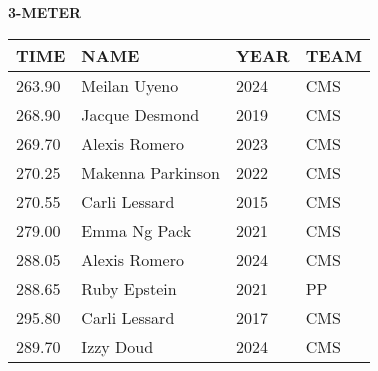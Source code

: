 \begin{table}[H]
\centering
\begin{minipage}[t]{0.6\textwidth}
\centering
\textbf{3-METER}\\[0.1cm]
\begin{tabular}{@{}p{1.8cm}p{2.8cm}p{1.2cm}p{1.4cm}@{}}
\hline
    \textbf{TIME} & \textbf{NAME} & \textbf{YEAR} & \textbf{TEAM} \\
\hline
    263.90 & Meilan Uyeno & 2024 & CMS \\
    268.90 & Jacque Desmond & 2019 & CMS \\
    269.70 & Alexis Romero & 2023 & CMS \\
    270.25 & Makenna Parkinson & 2022 & CMS \\
    270.55 & Carli Lessard & 2015 & CMS \\
    279.00 & Emma Ng Pack & 2021 & CMS \\
    288.05 & Alexis Romero & 2024 & CMS \\
    288.65 & Ruby Epstein & 2021 & PP \\
    295.80 & Carli Lessard & 2017 & CMS \\
    289.70 & Izzy Doud & 2024 & CMS \\
\hline
\end{tabular}
\end{minipage}
\end{table}


\newpage




